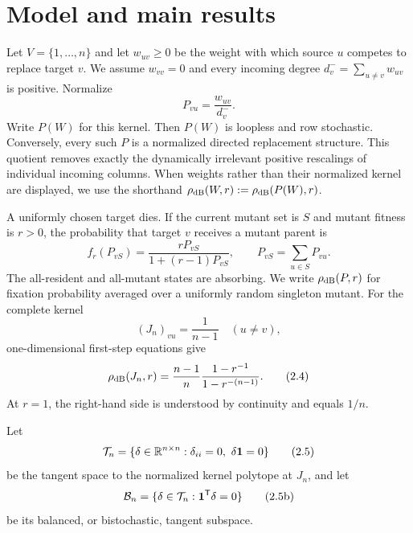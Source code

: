 \section{Model and main results}\label{sec:model-results}

Let $V=\{1,\ldots,n\}$ and let $w_{uv}\ge0$ be the weight with which source
$u$ competes to replace target $v$.  We assume $w_{vv}=0$ and every incoming
degree $d_v^-=\sum_{u\ne v}w_{uv}$ is positive.  Normalize
\[
 P_{vu}=\frac{w_{uv}}{d_v^-}.                              \tag{2.1}\label{2.1}
\]
Write $P(W)$ for this kernel.  Then $P(W)$ is loopless and row stochastic.
Conversely, every such $P$ is a normalized directed replacement structure.
This quotient removes exactly the dynamically irrelevant positive rescalings
of individual incoming columns.  When weights rather than their normalized
kernel are displayed, we use the shorthand
$\rho_{\mathrm{dB}}(W,r):=\rho_{\mathrm{dB}}(P(W),r)$.

A uniformly chosen target dies.  If the current mutant set is $S$ and mutant
fitness is $r>0$, the probability that target $v$ receives a mutant parent is
\[
 f_r(P_{vS})=\frac{rP_{vS}}{1+(r-1)P_{vS}},
 \qquad P_{vS}=\sum_{u\in S}P_{vu}.                         \tag{2.2}\label{2.2}
\]
The all-resident and all-mutant states are absorbing.  We write
$\rho_{\mathrm{dB}}(P,r)$ for fixation probability averaged over a uniformly random
singleton mutant.  For the complete kernel
\[
 (J_n)_{vu}=\frac1{n-1}\quad(u\ne v),                       \tag{2.3}\label{2.3}
\]
one-dimensional first-step equations give
\[
 \rho_{\mathrm{dB}}(J_n,r)
 =\frac{n-1}{n}\frac{1-r^{-1}}{1-r^{-(n-1)}}.               \tag{2.4}\label{2.4}
\]
At $r=1$, the right-hand side is understood by continuity and equals $1/n$.

Let
\[
 \calT_n=\{\delta\in\mathbb R^{n\times n}:
     \delta_{ii}=0,\ \delta\one=0\}                       \tag{2.5}\label{2.5}
\]
be the tangent space to the normalized kernel polytope at $J_n$, and let
\[
 \mathcal B_n=\{\delta\in\mathcal T_n:\mathbf 1^{\mathsf T}\delta=0\}       \tag{2.5b}\label{2.5b}
\]
be its balanced, or bistochastic, tangent subspace.


